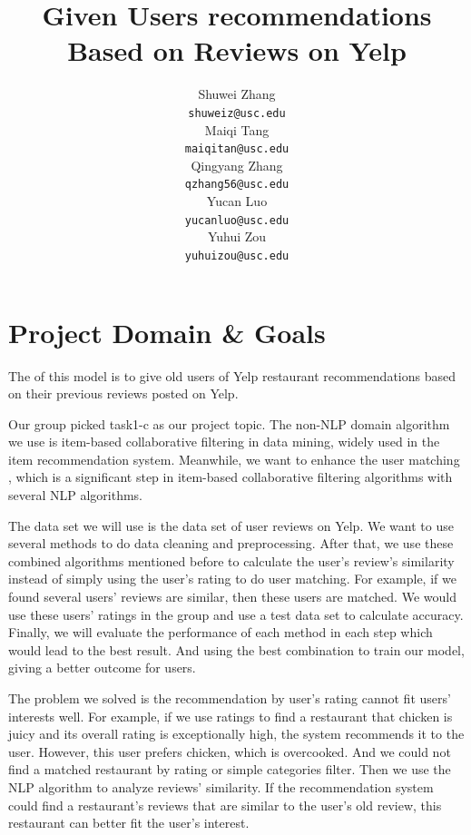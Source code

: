 \documentclass[11pt]{article}
\title{Given Users recommendations Based on Reviews on Yelp }
\author{
  Shuwei Zhang \\
  {\tt shuweiz@usc.edu} \\\And
  Maiqi Tang \\
  {\tt maiqitan@usc.edu} \\\And
  Qingyang Zhang \\
  {\tt qzhang56@usc.edu} \\\And
   Yucan Luo \\
  {\tt yucanluo@usc.edu} \\\And
  Yuhui Zou \\
  {\tt yuhuizou@usc.edu}
  }
\date{}
\begin{document}
\maketitle

\section{Project Domain \& Goals}
The of this model is to give old users of Yelp restaurant recommendations based on their previous reviews posted on Yelp.

Our group picked task1-c as our project topic. The non-NLP domain algorithm we use is item-based collaborative filtering in data mining, widely used in the item recommendation system. Meanwhile, we want to enhance the user matching , which is a significant step in item-based collaborative filtering algorithms with several NLP algorithms.

The data set we will use is the data set of user reviews on Yelp. We want to use several methods to do data cleaning and preprocessing. After that, we use these combined algorithms mentioned before to calculate the user’s review’s similarity instead of simply using the user's rating to do user matching. For example, if we found several users’ reviews are similar, then these users are matched. We would use these users’ ratings in the group and use a test data set to calculate accuracy. Finally, we will evaluate the performance of each method in each step which would lead to the best result. And using the best combination to train our model, giving a better outcome for users.

The problem we solved is the recommendation by user's rating cannot fit users' interests well. For example, if we use ratings to find a restaurant that chicken is juicy and its overall rating is exceptionally high, the system recommends it to the user. However, this user prefers chicken, which is overcooked. And we could not find a matched restaurant by rating or simple categories filter. Then we use the NLP algorithm to analyze reviews' similarity. If the recommendation system could find a restaurant's reviews that are similar to the user's old review, this restaurant can better fit the user's interest.
\end{document}
